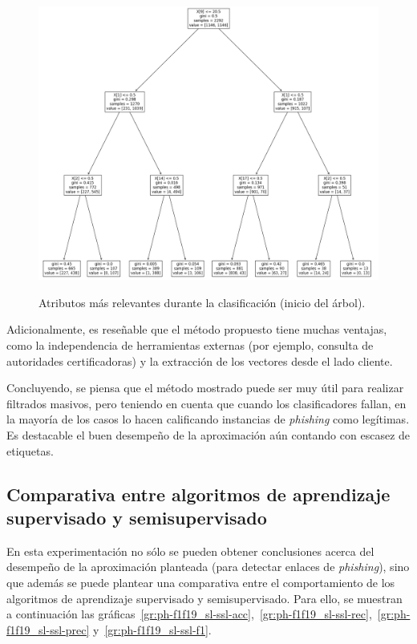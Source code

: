 \begin{figure}[h]
	\caption[\textit{Phishing}: detección (\texttt{f1-f19}, atributos relevantes DT)]{Atributos más relevantes durante la clasificación (inicio del árbol).}
	\centering
	\includegraphics[width=\textwidth]{../img/memoria/5_phishing/f1f19_tree}
	\label{gr:ph-f1f19_tree}
\end{figure}

Adicionalmente, es reseñable que el método propuesto tiene muchas ventajas, como la independencia de herramientas externas (por ejemplo, consulta de autoridades certificadoras) y la extracción de los vectores desde el lado cliente.

Concluyendo, se piensa que el método mostrado puede ser muy útil para realizar filtrados masivos, pero teniendo en cuenta que cuando los clasificadores fallan, en la mayoría de los casos lo hacen calificando instancias de \textit{phishing} como legítimas. Es destacable el buen desempeño de la aproximación aún contando con escasez de etiquetas.


\subsection{Comparativa entre algoritmos de aprendizaje supervisado y semisupervisado}

En esta experimentación no sólo se pueden obtener conclusiones acerca del desempeño de la aproximación planteada (para detectar enlaces de \textit{phishing}), sino que además se puede plantear una comparativa entre el comportamiento de los algoritmos de aprendizaje supervisado y semisupervisado. Para ello, se muestran a continuación las gráficas~\ref{gr:ph-f1f19_sl-ssl-acc},~\ref{gr:ph-f1f19_sl-ssl-rec},~\ref{gr:ph-f1f19_sl-ssl-prec} y~\ref{gr:ph-f1f19_sl-ssl-f1}.

